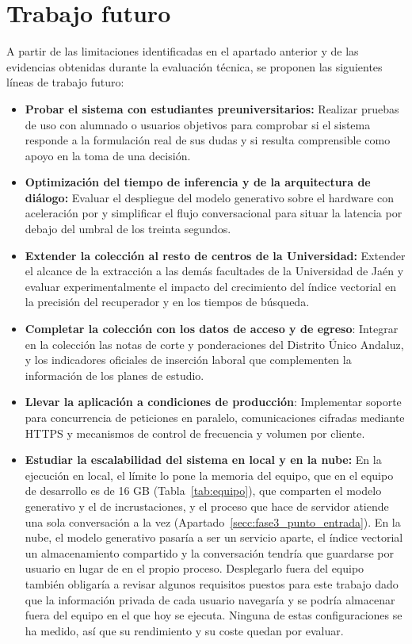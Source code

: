\section{Trabajo futuro}
\label{secc:trabajo_futuro}

A partir de las limitaciones identificadas en el apartado anterior y de las evidencias obtenidas durante la evaluación técnica, se proponen las siguientes líneas de trabajo futuro:

\begin{itemize}
  \item \textbf{Probar el sistema con estudiantes preuniversitarios:} Realizar pruebas de uso con alumnado o usuarios objetivos para comprobar si el sistema responde a la formulación real de sus dudas y si resulta comprensible como apoyo en la toma de una decisión.

  \item \textbf{Optimización del tiempo de inferencia y de
      la arquitectura de diálogo:} Evaluar el despliegue del modelo generativo sobre el hardware con aceleración por  y simplificar el flujo conversacional para situar la latencia por debajo del umbral de los treinta segundos.

  \item \textbf{Extender la colección al resto de centros
      de la Universidad:} Extender el alcance de la extracción a las demás facultades de la Universidad de Jaén y evaluar experimentalmente el impacto del crecimiento del índice vectorial en la precisión del recuperador y en los tiempos de búsqueda.

  \item \textbf{Completar la colección con los datos de
      acceso y de egreso}: Integrar en la colección las notas de corte y ponderaciones del Distrito Único Andaluz, y los indicadores oficiales de inserción laboral que complementen la información de los planes de estudio.

  \item \textbf{Llevar la aplicación a condiciones de
      producción}: Implementar soporte para concurrencia de peticiones en paralelo, comunicaciones cifradas mediante HTTPS y mecanismos de control de frecuencia y volumen por cliente.
\item \textbf{Estudiar la escalabilidad del sistema en local y en
      la nube:} En la ejecución en local, el límite lo pone la memoria del equipo, que en el equipo de desarrollo es de 16 GB (Tabla~\ref{tab:equipo}), que comparten el modelo generativo y el de incrustaciones, y el proceso que hace de servidor atiende una sola conversación a la vez (Apartado~\ref{secc:fase3_punto_entrada}). En la nube, el modelo generativo pasaría a ser un servicio aparte, el índice vectorial un almacenamiento compartido y la conversación tendría que guardarse por usuario en lugar de en el propio proceso. Desplegarlo fuera del equipo también obligaría a revisar algunos requisitos puestos para este trabajo dado que la información privada de cada usuario navegaría y se podría almacenar fuera del equipo en el que hoy se ejecuta. Ninguna de estas configuraciones se ha medido, así que su rendimiento y su coste quedan por evaluar.



\end{itemize}
